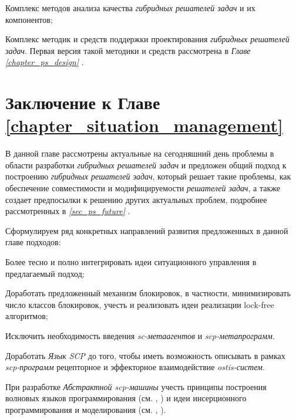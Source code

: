\begin{textitemize}
	\item Комплекс методов анализа качества \textit{гибридных решателей задач} и их компонентов;
	\item Комплекс методик и средств поддержки проектирования \textit{гибридных решателей задач}. Первая версия такой методики и средств рассмотрена в \textit{Главе \ref{chapter_ps_design} }.
\end{textitemize}

\section*{Заключение к Главе \ref{chapter_situation_management}}

В данной главе рассмотрены актуальные на сегодняшний день проблемы в области разработки \textit{гибридных решателей задач} и предложен общий подход к построению \textit{гибридных решателей задач}, который решает такие проблемы, как обеспечение совместимости и модифицируемости \textit{решателей задач}, а также создает предпосылки к решению других актуальных проблем, подробнее рассмотренных в \textit{\ref{sec_ps_future} }.

Сформулируем ряд конкретных направлений развития предложенных в данной главе подходов:

\begin{textitemize}
	\item Более тесно и полно интегрировать идеи ситуационного управления в предлагаемый подход;
	\item Доработать предложенный механизм блокировок, в частности, минимизировать число классов блокировок, учесть и реализовать идеи реализации lock-free алгоритмов;
	\item Исключить необходимость введения \textit{sc-метаагентов} и \textit{scp-метапрограмм}.
	\item Доработать \textit{Язык SCP} до того, чтобы иметь возможность описывать в рамках \textit{scp-программ} рецепторное и эффекторное взаимодействие \textit{ostis-систем}.
	\item При разработке \textit{Абстрактной scp-машины} учесть принципы построения волновых языков программирования (см. , ) и идеи инсерционного программирования и моделирования (см. , ).
\end{textitemize}

%